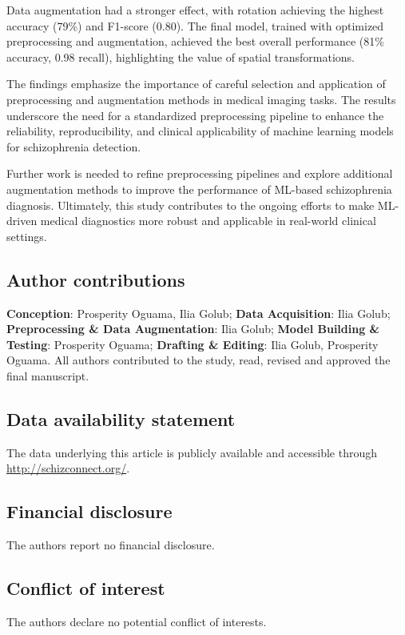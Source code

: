 Data augmentation had a stronger effect, with rotation achieving the highest accuracy (79\%) and F1-score (0.80). The final model, trained with optimized preprocessing and augmentation, achieved the best overall performance (81\% accuracy, 0.98 recall), highlighting the value of spatial transformations.

The findings emphasize the importance of careful selection and application of preprocessing and augmentation methods in medical imaging tasks. The results underscore the need for a standardized preprocessing pipeline to enhance the reliability, reproducibility, and clinical applicability of machine learning models for schizophrenia detection.

Further work is needed to refine preprocessing pipelines and explore additional augmentation methods to improve the performance of ML-based schizophrenia diagnosis. Ultimately, this study contributes to the ongoing efforts to make ML-driven medical diagnostics more robust and applicable in real-world clinical settings.



\subsection*{Author contributions}

\textbf{Conception}: Prosperity Oguama, Ilia Golub; \textbf{Data Acquisition}: Ilia Golub; \textbf{Preprocessing \& Data Augmentation}: Ilia Golub; \textbf{Model Building \& Testing}: Prosperity Oguama; \textbf{Drafting \& Editing}: Ilia Golub, Prosperity Oguama. All authors contributed to the study, read, revised and approved the final manuscript.

\subsection*{Data availability statement}
The data underlying this article is publicly available and accessible through \hyperlink{Schizconnect}{http://schizconnect.org/}.

\subsection*{Financial disclosure}

The authors report no financial disclosure.

\subsection*{Conflict of interest}

The authors declare no potential conflict of interests.

\renewcommand{\baselinestretch}{1.5}
\cleardoublepage    %


